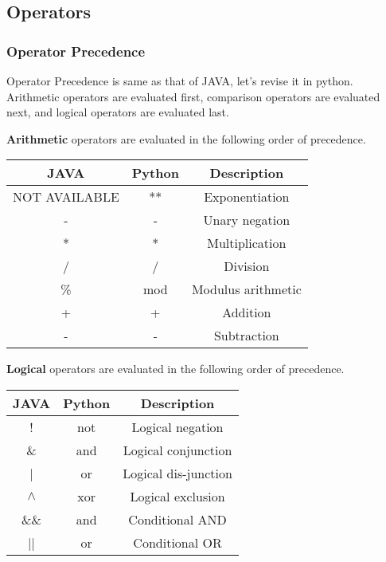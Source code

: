 \documentclass[a4paper,9pt]{extarticle}
\begin{document}
\begin{multicols*}{2}
\section{Operators}
\subsubsection{Operator Precedence}
Operator Precedence is same as that of JAVA, let's revise it in python. Arithmetic operators are evaluated first, comparison operators are evaluated next, and logical operators are evaluated last.

\textbf{Arithmetic} operators are evaluated in the following order of precedence.

\begin{center}
 \begin{tabular}{||c | c | c||}
 \hline
 \textbf{JAVA} & \textbf{Python} & \textbf{Description}\\ [1ex]
 \hline\hline
 NOT AVAILABLE & ** & Exponentiation\\
 \hline
 - & -  & Unary negation\\
 \hline
 * & * & Multiplication\\
 \hline
 / & / & Division\\
 \hline
 \% & mod & Modulus arithmetic\\
 \hline
 + & +  & Addition\\
 \hline
 - & - & Subtraction\\
 \hline
\end{tabular}
\end{center}

\textbf{Logical} operators are evaluated in the following order of precedence.

\begin{center}
 \begin{tabular}{||c | c | c||}
 \hline
 \textbf{JAVA} & \textbf{Python} & \textbf{Description}\\ [1ex]
 \hline\hline
  ! & not & Logical negation\\
 \hline
 \&  & and & Logical conjunction\\
 \hline
 | & or & Logical dis-junction\\
 \hline
 $\wedge$ & xor & Logical exclusion \\
 \hline
  \&\& & and & Conditional AND\\
 \hline
  || & or & Conditional OR\\
 \hline
\end{tabular}
\end{center}


\end{multicols*}
\end{document}
